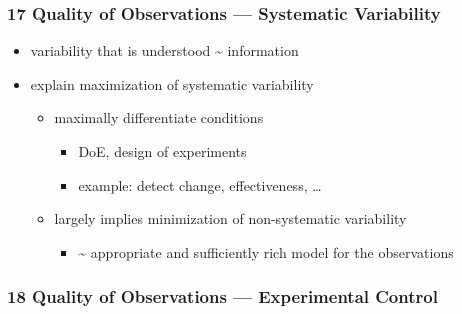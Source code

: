 \documentclass[
]{article}
\providecommand{\tightlist}{%
  \setlength{\itemsep}{0pt}\setlength{\parskip}{0pt}}
\begin{document}
\hypertarget{quality-of-observations-systematic-variability}{%
\subsubsection{17 Quality of Observations --- Systematic
Variability}\label{quality-of-observations-systematic-variability}}

\begin{itemize}
\tightlist
\item
  variability that is understood \textasciitilde{} information
\item
  explain maximization of systematic variability

  \begin{itemize}
  \tightlist
  \item
    maximally differentiate conditions

    \begin{itemize}
    \tightlist
    \item
      DoE, design of experiments
    \item
      example: detect change, effectiveness, \ldots{}
    \end{itemize}
  \item
    largely implies minimization of non-systematic variability

    \begin{itemize}
    \tightlist
    \item
      \textasciitilde{} appropriate and sufficiently rich model for the
      observations
    \end{itemize}
  \end{itemize}
\end{itemize}

\hypertarget{quality-of-observations-experimental-control}{%
\subsubsection{18 Quality of Observations --- Experimental
Control}\label{quality-of-observations-experimental-control}}
\end{document}
